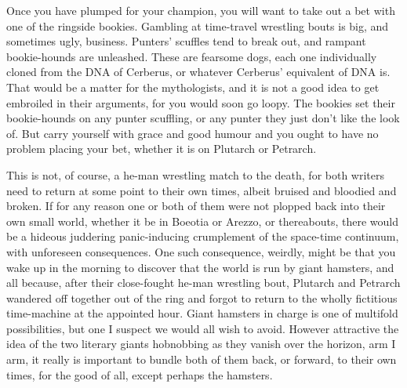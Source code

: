 Once you have plumped for your champion, you will want to take out a bet with one of the ringside bookies. Gambling at time-travel wrestling bouts is big, and sometimes ugly, business. Punters' scuffles tend to break out, and rampant bookie-hounds are unleashed. These are fearsome dogs, each one individually cloned from the DNA of Cerberus, or whatever Cerberus' equivalent of DNA is. That would be a matter for the mythologists, and it is not a good idea to get embroiled in their arguments, for you would soon go loopy. The bookies set their bookie-hounds on any punter scuffling, or any punter they just don't like the look of. But carry yourself with grace and good humour and you ought to have no problem placing your bet, whether it is on Plutarch or Petrarch.

This is not, of course, a he-man wrestling match to the death, for both writers need to return at some point to their own times, albeit bruised and bloodied and broken. If for any reason one or both of them were not plopped back into their own small world, whether it be in Boeotia or Arezzo, or thereabouts, there would be a hideous juddering panic-inducing crumplement of the space-time continuum, with unforeseen consequences. One such consequence, weirdly, might be that you wake up in the morning to discover that the world is run by giant hamsters, and all because, after their close-fought he-man wrestling bout, Plutarch and Petrarch wandered off together out of the ring and forgot to return to the wholly fictitious time-machine at the appointed hour. Giant hamsters in charge is one of multifold possibilities, but one I suspect we would all wish to avoid. However attractive the idea of the two literary giants hobnobbing as they vanish over the horizon, arm I arm, it really is important to bundle both of them back, or forward, to their own times, for the good of all, except perhaps the hamsters.